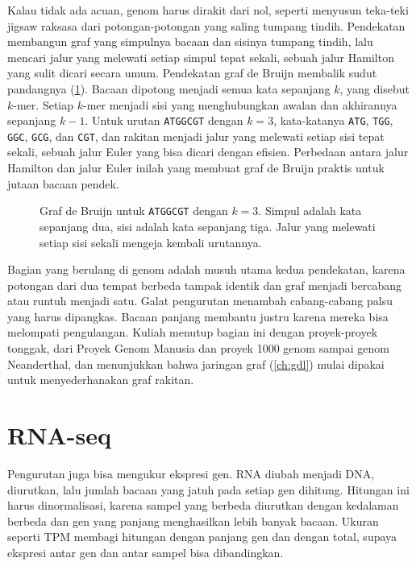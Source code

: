 Kalau tidak ada acuan, genom harus dirakit dari nol, seperti menyusun teka-teki jigsaw raksasa dari potongan-potongan yang
saling tumpang tindih. Pendekatan  membangun graf yang simpulnya bacaan dan sisinya
tumpang tindih, lalu mencari jalur yang melewati setiap simpul tepat sekali, sebuah jalur Hamilton yang sulit dicari
secara umum. Pendekatan graf de Bruijn membalik sudut pandangnya (\cref{fig:debruijn}). Bacaan dipotong menjadi semua
kata sepanjang $k$, yang disebut $k$-mer. Setiap $k$-mer menjadi sisi yang menghubungkan awalan dan akhirannya sepanjang
$k-1$. Untuk urutan \texttt{ATGGCGT} dengan $k=3$, kata-katanya \texttt{ATG}, \texttt{TGG}, \texttt{GGC}, \texttt{GCG}, dan
\texttt{CGT}, dan rakitan menjadi jalur yang melewati setiap sisi tepat sekali, sebuah jalur Euler yang bisa dicari dengan
efisien. Perbedaan antara jalur Hamilton dan jalur Euler inilah yang membuat graf de Bruijn praktis untuk jutaan bacaan
pendek.

\begin{figure}[ht]
\centering
{}
\caption{Graf de Bruijn untuk \texttt{ATGGCGT} dengan $k=3$. Simpul adalah kata sepanjang dua, sisi adalah kata
sepanjang tiga. Jalur yang melewati setiap sisi sekali mengeja kembali urutannya.}
\label{fig:debruijn}
\end{figure}

Bagian yang berulang di genom adalah musuh utama kedua pendekatan, karena potongan dari dua tempat berbeda tampak identik
dan graf menjadi bercabang atau runtuh menjadi satu. Galat pengurutan menambah cabang-cabang palsu yang harus dipangkas.
Bacaan panjang membantu justru karena mereka bisa melompati pengulangan. Kuliah menutup bagian ini dengan
proyek-proyek tonggak, dari Proyek Genom Manusia dan proyek 1000 genom sampai genom Neanderthal, dan menunjukkan bahwa
jaringan graf (\cref{ch:gdl}) mulai dipakai untuk menyederhanakan graf rakitan.

\section{RNA-seq}

Pengurutan juga bisa mengukur ekspresi gen. RNA diubah menjadi DNA, diurutkan, lalu jumlah bacaan yang jatuh pada setiap
gen dihitung. Hitungan ini harus dinormalisasi, karena sampel yang berbeda diurutkan dengan kedalaman berbeda dan gen
yang panjang menghasilkan lebih banyak bacaan. Ukuran seperti TPM membagi hitungan dengan panjang gen dan dengan total,
supaya ekspresi antar gen dan antar sampel bisa dibandingkan.

